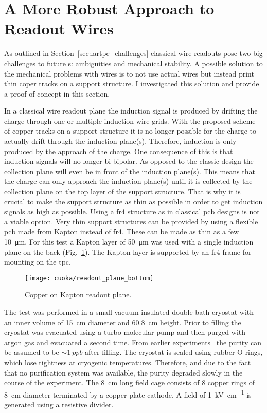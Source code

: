 \section{A More Robust Approach to  Readout Wires}
\label{sec:studies_cuoka}

As outlined in Section~\ref{sec:lartpc_challenges} classical wire readouts pose two big challenges to future \lartpc{}s: ambiguities and mechanical stability.
A possible solution to the mechanical problems with wires is to not use actual wires but instead print thin coper tracks on a support structure.
I investigated this solution and provide a proof of concept in this section.

In a classical wire readout plane the induction signal is produced by drifting the charge through one or multiple induction wire grids.
With the proposed scheme of copper tracks on a support structure it is no longer possible for the charge to actually drift through the induction plane(s).
Therefore, induction is only produced by the approach of the charge.
One consequence of this is that induction signals will no longer bi bipolar.
As opposed to the classic design the collection plane will even be in front of the induction plane(s).
This means that the charge can only approach the induction plane(s) until it is collected by the collection plane on the top layer of the support structure.
That is why it is crucial to make the support structure as thin as possible in order to get induction signals as high as possible.
Using a \gls{fr4} structure as in classical \gls{pcb} designs is not a viable option.
Very thin support structures can be provided by using a flexible \gls{pcb} made from Kapton instead of \gls{fr4}.
These can be made as thin as a few \SI{10}{\micro\metre}.
For this test a Kapton layer of \SI{50}{\micro\metre} was used with a single induction plane on the back (Fig.~\ref{fig:cuoka_readout-plane}).
The Kapton layer is supported by an \gls{fr4} frame for mounting on the \gls{tpc}.

\begin{figure}[htb]
	\centering
	\texttt{[image: cuoka/readout\_plane\_bottom]}
	\caption[Copper on Kapton readout plane]{%
		Copper on Kapton readout plane.
	}
	\label{fig:cuoka_readout-plane}
\end{figure}

The test was performed in a small vacuum-insulated double-bath cryostat with an inner volume of \SI{15}{\centi\metre} diameter and \SI{60.8}{\centi\metre} height.
Prior to filling the cryostat was evacuated using a turbo-molecular pump and then purged with argon gas and evacuated a second time.
From earlier experiments~\cite{2photonAbs} the purity can be assumed to be $\sim{\SI{1}{ppb}}$ after filling.
The cryostat is sealed using rubber O-rings, which lose tightness at cryogenic temperatures.
Therefore, and due to the fact that no purification system was available, the purity degraded slowly in the course of the experiment.
The \SI{8}{\centi\metre} long field cage consists of \num{8} copper rings of \SI{8}{\centi\metre} diameter terminated by a copper plate cathode.
A field of \SI{1}{\kilo\volt\per\centi\metre} is generated using a resistive divider.

